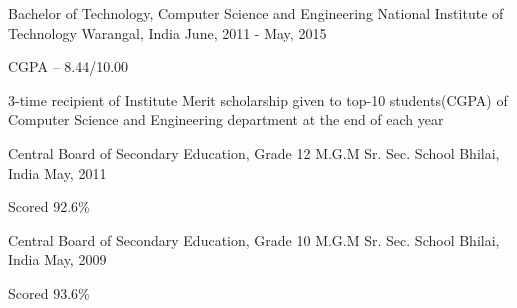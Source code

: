 

\begin{cventries}

  \cventry
    {Bachelor of Technology, Computer Science and Engineering} %
    {National Institute of Technology} %
    {Warangal, India} %
    {June, 2011 - May, 2015} %
    {
      \begin{cvitems} %
        \item {CGPA -- 8.44/10.00}
        \item {3-time recipient of Institute Merit scholarship given to top-10 students(CGPA) of Computer Science and Engineering department at the end of each year}
      \end{cvitems}
    }

  \cventry
    {Central Board of Secondary Education, Grade 12} %
    {M.G.M Sr. Sec. School} %
    {Bhilai, India} %
    {May, 2011} %
    {
      \begin{cvitems} %
        \item {Scored 92.6\%}
      \end{cvitems}
    }

  \cventry
    {Central Board of Secondary Education, Grade 10} %
    {M.G.M Sr. Sec. School} %
    {Bhilai, India} %
    {May, 2009} %
    {
      \begin{cvitems} %
        \item {Scored 93.6\%}
      \end{cvitems}
    }

\end{cventries}
